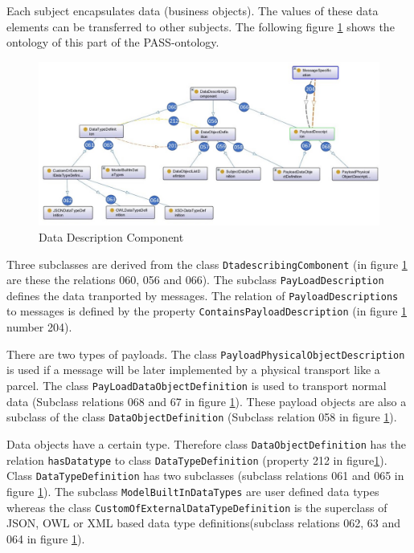 Each subject encapsulates data (business objects). The values of these data elements can be transferred to other subjects. The following figure \ref{fig:20181218-data} shows the ontology of this part of the PASS-ontology.

\begin{figure}[htbp]
	\centering
	\includegraphics[width=0.9\linewidth]{Figures/Ontology/SubjectInteraction/20181218-Data}
	\caption[Data Description Component]{Data Description Component}
	\label{fig:20181218-data}
\end{figure}

Three subclasses are derived from the class \texttt{DtadescribingCombonent} (in figure \ref{fig:20181218-data} are these the relations 060, 056 and 066). The subclass \texttt{PayLoadDescription} defines the data tranported by messages. The relation of \texttt{PayloadDescriptions} to messages is defined by the property \texttt{ContainsPayloadDescription} (in figure \ref{fig:20181218-data} number 204).

There are two types of payloads. The class \texttt{PayloadPhysicalObjectDescription} is used if a message will be later implemented by a physical transport like a parcel. The class \texttt{PayLoadDataObjectDefinition} is used to transport normal data (Subclass relations 068 and 67 in figure \ref{fig:20181218-data}). These payload objects are also a subclass of the class \texttt{DataObjectDefinition} (Subclass relation 058 in figure \ref{fig:20181218-data}).

Data objects have a certain type. Therefore class \texttt{DataObjectDefinition} has the relation \texttt{hasDatatype} to class \texttt{DataTypeDefinition} (property 212 in figure\ref{fig:20181218-data}). Class \texttt{DataTypeDefinition} has two subclasses (subclass relations 061 and 065 in figure \ref{fig:20181218-data}). The subclass \texttt{ModelBuiltInDataTypes} are user defined data types whereas the class \texttt{CustomOfExternalDataTypeDefinition} is the superclass of JSON, OWL or XML based data type definitions(subclass relations 062, 63 and 064 in figure \ref{fig:20181218-data}).

